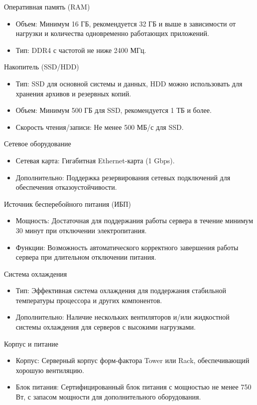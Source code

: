 Оперативная память (RAM)
\begin{itemize}
	\item Объем: Минимум 16 ГБ, рекомендуется 32 ГБ и выше в зависимости от нагрузки и количества одновременно работающих приложений.
	\item Тип: DDR4 с частотой не ниже 2400 МГц.
\end{itemize}

Накопитель (SSD/HDD)
\begin{itemize}
	\item Тип: SSD для основной системы и данных, HDD можно использовать для хранения архивов и резервных копий.
	\item Объем: Минимум 500 ГБ для SSD, рекомендуется 1 ТБ и более.
	\item Скорость чтения/записи: Не менее 500 МБ/с для SSD.
\end{itemize}

Сетевое оборудование
\begin{itemize}
	\item Сетевая карта: Гигабитная Ethernet-карта (1 Gbps).
	\item Дополнительно: Поддержка резервирования сетевых подключений для обеспечения отказоустойчивости.
\end{itemize}

Источник бесперебойного питания (ИБП)
\begin{itemize}
	\item Мощность: Достаточная для поддержания работы сервера в течение минимум 30 минут при отключении электропитания.
	\item Функции: Возможность автоматического корректного завершения работы сервера при длительном отключении питания.
\end{itemize}

Система охлаждения
\begin{itemize}
	\item Тип: Эффективная система охлаждения для поддержания стабильной температуры процессора и других компонентов.
	\item Дополнительно: Наличие нескольких вентиляторов и/или жидкостной системы охлаждения для серверов с высокими нагрузками.
\end{itemize}

Корпус и питание
\begin{itemize}
	\item Корпус: Серверный корпус форм-фактора Tower или Rack, обеспечивающий хорошую вентиляцию.
	\item Блок питания: Сертифицированный блок питания с мощностью не менее 750 Вт, с запасом мощности для дополнительного оборудования.
\end{itemize}

